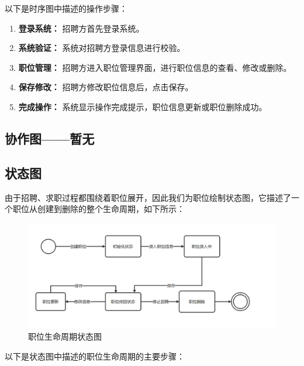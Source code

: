 \documentclass[UTF8,a4paper,10pt]{ctexart}
\begin{document}
以下是时序图中描述的操作步骤：

\begin{enumerate}
    \item \textbf{登录系统：} 招聘方首先登录系统。
    \item \textbf{系统验证：} 系统对招聘方登录信息进行校验。
    \item \textbf{职位管理：} 招聘方进入职位管理界面，进行职位信息的查看、修改或删除。
    \item \textbf{保存修改：} 招聘方修改职位信息后，点击保存。
    \item \textbf{完成操作：} 系统显示操作完成提示，职位信息更新或职位删除成功。
\end{enumerate}

\subsection{协作图——暂无}

\subsection{状态图}

由于招聘、求职过程都围绕着职位展开，因此我们为职位绘制状态图，它描述了一个职位从创建到删除的整个生命周期，如下所示：

\begin{figure}[H]
    \centering
    \includegraphics[width=\textwidth]{img/职位状态图.png} 
    \caption{职位生命周期状态图}
    \label{fig:职位状态图}
\end{figure}

以下是状态图中描述的职位生命周期的主要步骤：
\end{document}
